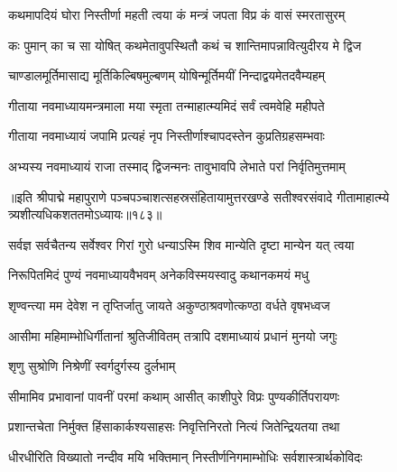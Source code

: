 \twolineshloka
{कथमापदियं घोरा निस्तीर्णा महती त्वया}
{कं मन्त्रं जपता विप्र कं वासं स्मरतासुरम्} %

\twolineshloka
{कः पुमान् का च सा योषित् कथमेतावुपस्थितौ}
{कथं च शान्तिमापन्नावित्युदीरय मे द्विज} %


\twolineshloka
{चाण्डालमूर्तिमासाद्य मूर्तिकिल्बिषमुल्बणम्}
{योषिन्मूर्तिमयीं निन्दाद्वयमेतदवैम्यहम्} %

\twolineshloka
{गीताया नवमाध्यायमन्त्रमाला मया स्मृता}
{तन्माहात्म्यमिदं सर्वं त्वमवेहि महीपते} %

\twolineshloka
{गीताया नवमाध्यायं जपामि प्रत्यहं नृप}
{निस्तीर्णाश्चापदस्तेन कुप्रतिग्रहसम्भवाः} %

\twolineshloka
{अभ्यस्य नवमाध्यायं राजा तस्माद् द्विजन्मनः}
{तावुभावपि लेभाते परां निर्वृतिमुत्तमाम्} %

॥इति श्रीपाद्मे महापुराणे पञ्चपञ्चाशत्सहस्रसंहितायामुत्तरखण्डे सतीश्वरसंवादे गीतामाहात्म्ये त्र्यशीत्यधिकशततमोऽध्यायः॥१८३॥

\genMangalaShloka

\closesub

\ganapatyadiDhyanam
\padmaPuranam



\twolineshloka
{सर्वज्ञ सर्वचैतन्य सर्वेश्वर गिरां गुरो}
{धन्याऽस्मि शिव मान्येति दृष्टा मान्येन यत् त्वया} %

\twolineshloka
{निरूपितमिदं पुण्यं नवमाध्यायवैभवम्}
{अनेकविस्मयस्वादु कथानकमयं मधु} %

\twolineshloka
{शृण्वन्त्या मम देवेश न तृप्तिर्जातु जायते}
{अकुण्ठाश्रवणोत्कण्ठा वर्धते वृषभध्वज} %

\twolineshloka
{आसीमा महिमाम्भोधिर्गीतानां श्रुतिजीवितम्}
{तत्रापि दशमाध्यायं प्रधानं मुनयो जगुः} %



\onelineshloka
{शृणु सुश्रोणि निश्रेणीं स्वर्गदुर्गस्य दुर्लभाम्} %

\twolineshloka
{सीमामिव प्रभावानां पावनीं परमां कथाम्}
{आसीत् काशीपुरे विप्रः पुण्यकीर्तिपरायणः} %

\twolineshloka
{प्रशान्तचेता निर्मुक्त हिंसाकार्कश्यसाहसः}
{निवृत्तिनिरतो नित्यं जितेन्द्रियतया तथा} %

\twolineshloka
{धीरधीरिति विख्यातो नन्दीव मयि भक्तिमान्}
{निस्तीर्णनिगमाम्भोधिः सर्वशास्त्रार्थकोविदः} %

